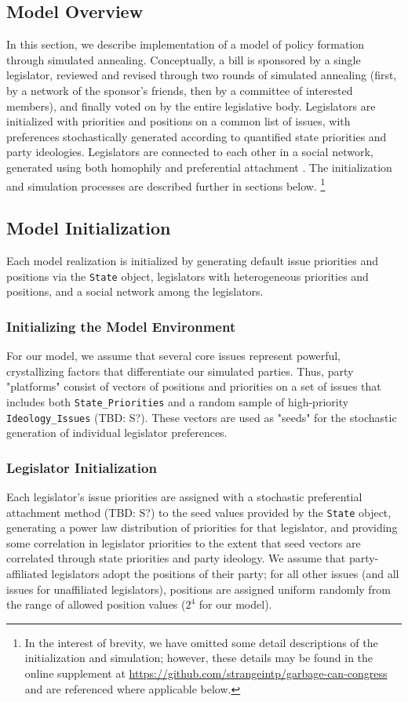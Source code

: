 \documentclass[pdftex,12pt]{llncs}
\begin{document}
\subsection{Model Overview}
In this section, we describe implementation of a model of policy formation through simulated annealing.
Conceptually, a bill is sponsored by a single legislator, reviewed and revised through two rounds of simulated annealing (first, by a network of the sponsor's friends, then by a committee of interested members), and finally voted on by the entire legislative body.
Legislators are initialized with priorities and positions on a common list of issues, with preferences stochastically generated according to quantified state priorities and party ideologies.
Legislators are connected to each other in a social network, generated using both homophily \parencite{msc01, br11} and preferential attachment \parencite{Barabasi1999}.
The initialization and simulation processes are described further in sections below.
\footnote{In the interest of brevity, we have omitted some detail descriptions of the initialization and simulation; however, these details may be found in the online supplement at \url{https://github.com/strangeintp/garbage-can-congress} and are referenced where applicable below.}

\subsection{Model Initialization}
Each model realization is initialized by generating default issue priorities and positions via the \texttt{State} object, legislators with heterogeneous priorities and positions, and a social network among the legislators.

\subsubsection{Initializing the Model Environment}
For our model, we assume that several core issues represent powerful, crystallizing factors that differentiate our simulated parties.
Thus, party "platforms" consist of vectors of positions and priorities on a set of issues that includes both \texttt{State\_Priorities} and a random sample of high-priority \texttt{Ideology\_Issues} (TBD: S?).
These vectors are used as "seeds" for the stochastic generation of individual legislator preferences.

\subsubsection{Legislator Initialization}
Each legislator's issue priorities are assigned with a stochastic preferential attachment method  (TBD: S?) to the seed values provided by the \texttt{State} object, generating a power law distribution of priorities for that legislator, and providing some correlation in legislator priorities to the extent that seed vectors are correlated through state priorities and party ideology.
We assume that party-affiliated legislators adopt the positions of their party; for all other issues (and all issues for unaffiliated legislators), positions are assigned uniform randomly from the range of allowed position values ($2^4$ for our model).
\end{document}
